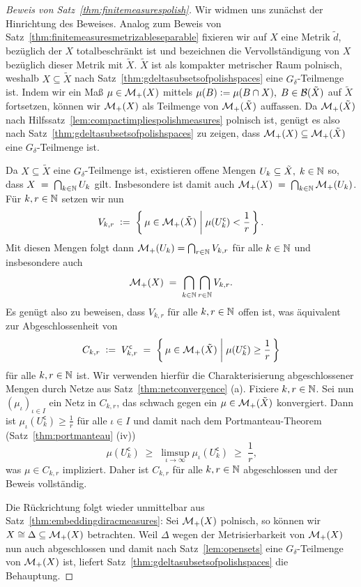 \documentclass[../main/main.tex]{subfiles}
\begin{document}
	\begin{proof}[Beweis von Satz~\ref{thm:finitemeasurespolish}]
		Wir widmen uns zunächst der Hinrichtung des Beweises. Analog zum Beweis von Satz~\ref{thm:finitemeasuresmetrizableseparable} fixieren wir auf 
		$X$ eine Metrik $\tilde{d}$, bezüglich der $X$ totalbeschränkt ist und
		bezeichnen die Vervollständigung von $X$ bezüglich dieser Metrik mit $\tilde{X}$. $\tilde{X}$ ist als kompakter metrischer Raum polnisch, weshalb $X \subseteq \tilde{X}$
		nach Satz~\ref{thm:gdeltasubsetsofpolishspaces} eine $G_\delta$-Teilmenge ist. Indem wir ein Maß $\mu \in \mathcal{M}_{+}(X)$ mittels 
		$\mu(B) \vcentcolon = \mu(B \cap X), \; B \in \mathcal{B}(\tilde{X})$ auf $\tilde{X}$ fortsetzen, können wir $\mathcal{M}_{+}(X)$ als Teilmenge von $\mathcal{M}_{+}(\tilde{X})$
		auffassen. Da $\mathcal{M}_{+}(\tilde{X})$ nach 
		Hilfssatz~\ref{lem:compactimpliespolishmeasures} polnisch ist, genügt es also nach Satz~\ref{thm:gdeltasubsetsofpolishspaces} zu zeigen, 
		dass $\mathcal{M}_{+}(X) \subseteq \mathcal{M}_{+}(\tilde{X})$ eine $G_\delta$-Teilmenge ist.
		
		Da $X \subseteq \tilde{X}$ eine $G_\delta$-Teilmenge ist, existieren offene Mengen $U_k \subseteq \tilde{X}, \; k \in \mathbb{N}$ so, dass 
		$X \; = \; \bigcap_{k \in \mathbb{N}} U_k$
		gilt. Insbesondere ist damit auch
		$\mathcal{M}_{+}(X) \; = \; \bigcap_{k \in \mathbb{N}} \mathcal{M}_{+}(U_k)$.
		Für $k, r \in \mathbb{N}$ setzen wir nun
		\[ V_{k, r} \; \vcentcolon = \; \left\{\, \mu \in \mathcal{M}_{+}(\tilde{X}) \; \middle| \; \mu(U_k^{\mathsf{c}}) < \frac{1}{r} \,\right\} \text{.} \]
		Mit diesen Mengen folgt dann $\mathcal{M}_{+}(U_k) = \bigcap_{r \in \mathbb{N}} V_{k, r}$ für alle $k \in \mathbb{N}$ und insbesondere auch
		\[ \mathcal{M}_{+}(X) \; = \; \bigcap_{k \in \mathbb{N}} \bigcap_{r \in \mathbb{N}} V_{k, r} \text{.} \]
		Es genügt also zu beweisen, dass $V_{k, r}$ für alle $k, r \in \mathbb{N}$ offen ist, was äquivalent zur Abgeschlossenheit von 
		\[C_{k, r} \; \vcentcolon = \; V_{k, r}^{\mathsf{c}} \; = \; \left\{\, \mu \in \mathcal{M}_{+}(\tilde{X}) \; \middle| \; \mu(U_k^{\mathsf{c}}) \geq \frac{1}{r} \,\right\} \] 
		für alle $k, r \in \mathbb{N}$ ist. Wir verwenden hierfür die Charakterisierung abgeschlossener Mengen durch Netze aus Satz~\ref{thm:netconvergence} (a).
		Fixiere $k, r \in \mathbb{N}$. Sei nun $(\mu_\iota)_{\iota \in I}$ ein Netz in $C_{k, r}$, das schwach gegen ein $\mu \in \mathcal{M}_{+}(\tilde{X})$ konvergiert.
		Dann ist $\mu_\iota(U_k^{\mathsf{c}}) \geq \frac{1}{r}$ für alle $\iota \in I$ und damit nach dem Portmanteau-Theorem (Satz~\ref{thm:portmanteau} (iv))
		\[ \mu(U_k^{\mathsf{c}}) \; \geq \; \limsup_{\iota \to \infty} \mu_\iota(U_k^{\mathsf{c}}) \; \geq \; \frac{1}{r} \text{,} \]
		was $\mu \in C_{k, r}$ impliziert. Daher ist $C_{k, r}$ für alle $k, r \in \mathbb{N}$ abgeschlossen und der Beweis vollständig.
		
		Die Rückrichtung folgt wieder unmittelbar aus Satz~\ref{thm:embeddingdiracmeasures}: Sei $\mathcal{M}_{+}(X)$ polnisch, 
		so können wir $X \cong \Delta \subseteq \mathcal{M}_{+}(X)$ betrachten. Weil $\Delta$ wegen der Metrisierbarkeit von $\mathcal{M}_{+}(X)$ nun auch abgeschlossen und damit nach 
		Satz~\ref{lem:opensets} eine $G_\delta$-Teilmenge von $\mathcal{M}_{+}(X)$ ist, liefert Satz~\ref{thm:gdeltasubsetsofpolishspaces} die Behauptung.
	\end{proof}
\end{document}
